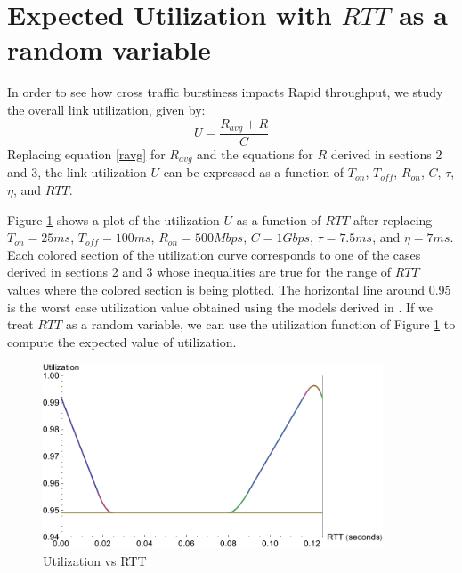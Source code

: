 \section{Expected Utilization with $RTT$ as a random variable}
  In order to see how cross traffic burstiness impacts Rapid throughput, we 
  study the overall link utilization, given by:
  \begin{equation}
    U = \frac{R_{avg} + R}{C}
    \label{util}
  \end{equation}
  Replacing equation \eqref{ravg} for $R_{avg}$ and the equations for $R$ 
  derived in sections 2 and 3, the link utilization $U$ can be expressed as a 
  function of $T_{on}$, $T_{off}$, $R_{on}$, $C$, $\tau$, $\eta$, and $RTT$. 
  
  Figure \ref{utilvsrtt} shows a plot of the utilization $U$ as a function of 
  $RTT$ after replacing $T_{on} = 25 ms$, $T_{off} = 100 ms$, 
  $R_{on} = 500 Mbps$, $C = 1Gbps$, $\tau = 7.5 ms$, and $\eta = 7 ms$. Each 
  colored section of the utilization curve corresponds to one of the cases 
  derived in sections 2 and 3 whose inequalities are true for the range 
  of $RTT$ values where the colored section is being plotted. The 
  horizontal line around 0.95 is the worst case utilization value obtained 
  using the models derived in \cite{Lovewell2011-Noise-TR}. If we treat 
  $RTT$ as a random variable, we can use the utilization function of Figure 
  \ref{utilvsrtt} to compute the expected value of utilization.
  \begin{figure}[!htb]
    \centering
    \includegraphics[width=0.9\textwidth]{img/utilvsrtt.pdf}
    \caption{Utilization vs RTT}
    \label{utilvsrtt}
  \end{figure}

